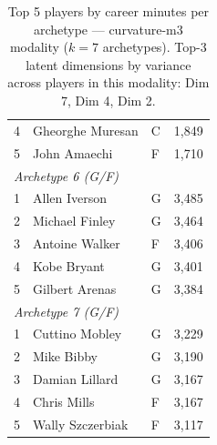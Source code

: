 \begin{table}[htbp]
\begin{tabular}{rlll}
    4 & Gheorghe Muresan & C & 1,849 \\
    5 & John Amaechi & F & 1,710 \\
    \midrule[0.4pt]
    \multicolumn{4}{l}{\textit{Archetype 6 (G/F)}} \\
    \midrule
    1 & Allen Iverson & G & 3,485 \\
    2 & Michael Finley & G & 3,464 \\
    3 & Antoine Walker & F & 3,406 \\
    4 & Kobe Bryant & G & 3,401 \\
    5 & Gilbert Arenas & G & 3,384 \\
    \midrule[0.4pt]
    \multicolumn{4}{l}{\textit{Archetype 7 (G/F)}} \\
    \midrule
    1 & Cuttino Mobley & G & 3,229 \\
    2 & Mike Bibby & G & 3,190 \\
    3 & Damian Lillard & G & 3,167 \\
    4 & Chris Mills & F & 3,167 \\
    5 & Wally Szczerbiak & F & 3,117 \\
    \bottomrule
  \end{tabular}
  \caption{Top 5 players by career minutes per archetype --- curvature-m3 modality ($k=7$ archetypes). Top-3 latent dimensions by variance across players in this modality: Dim 7, Dim 4, Dim 2.}
  \label{tab:arch_reps_curvature_m3}
\end{table}

